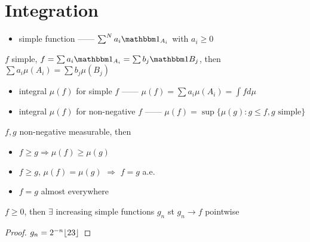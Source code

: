 \section{Integration}\label{sec:integration}

\begin{itemize}
    \item simple function ------ $\sum^N a_i \In_{A_{i}}$ with $a_i \geq 0$
\end{itemize}

\begin{lemma}
   $f$ simple, $f = \sum a_i\In_{A_i} = \sum b_j \In{B_j}$, then $\sum a_i \mu(A_i) = \sum b_j \mu(B_j)$
\end{lemma}

\begin{itemize}
    \item integral $\mu(f)$ for simple $f$ ------ $\mu(f) = \sum a_i \mu(A_i) = \int f d\mu$
    \item integral $\mu(f)$ for non-negative $f$ ------ $\mu(f) = \sup \{\mu(g) : g \leq f, g \text{ simple}\}$
\end{itemize}

\begin{prop}[positivity]
    $f, g$ non-negative measurable, then
    \begin{itemize}
        \item $f \geq g \Rightarrow \mu(f) \geq \mu(g)$
        \item $f \geq g$, $\mu(f) = \mu(g)$ $\Rightarrow$ $f = g$ a.e.
    \end{itemize}
\end{prop}

\begin{itemize}
    \item $f = g$ almost everywhere
\end{itemize}

\begin{lemma}
    $f \geq 0$, then $\exists$ increasing simple functions $g_n$ st $g_n \rightarrow f$ pointwise 
\end{lemma}
\begin{proof}
    $g_n = 2^{-n}\lfloor23\rfloor$
\end{proof}